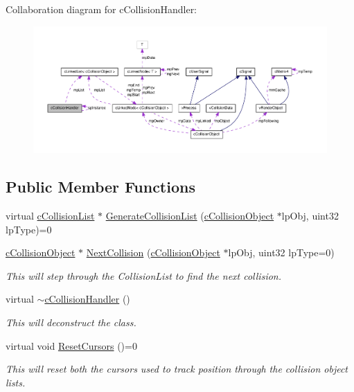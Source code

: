 Collaboration diagram for cCollisionHandler:
\nopagebreak
\begin{figure}[H]
\begin{center}
\leavevmode
\includegraphics[width=400pt]{classc_collision_handler__coll__graph}
\end{center}
\end{figure}
\subsection*{Public Member Functions}
\begin{DoxyCompactItemize}
\item 
virtual \hyperlink{classc_collision_list}{cCollisionList} $\ast$ \hyperlink{classc_collision_handler_aa52da10a253a2497db9b197c3f0c760d}{GenerateCollisionList} (\hyperlink{classc_collision_object}{cCollisionObject} $\ast$lpObj, uint32 lpType)=0
\item 
\hyperlink{classc_collision_object}{cCollisionObject} $\ast$ \hyperlink{classc_collision_handler_a16c22c6972aae6dbcae454600a2e08a6}{NextCollision} (\hyperlink{classc_collision_object}{cCollisionObject} $\ast$lpObj, uint32 lpType=0)
\begin{DoxyCompactList}\small\item\em This will step through the CollisionList to find the next collision. \item\end{DoxyCompactList}\item 
virtual \hyperlink{classc_collision_handler_afbb3eb88e634395b7c4ee38806fc2997}{$\sim$cCollisionHandler} ()
\begin{DoxyCompactList}\small\item\em This will deconstruct the class. \item\end{DoxyCompactList}\item 
virtual void \hyperlink{classc_collision_handler_a4fe00bffd2defe0a71a17c5fadd3b890}{ResetCursors} ()=0
\begin{DoxyCompactList}\small\item\em This will reset both the cursors used to track position through the collision object lists. \item\end{DoxyCompactList}\end{DoxyCompactItemize}
